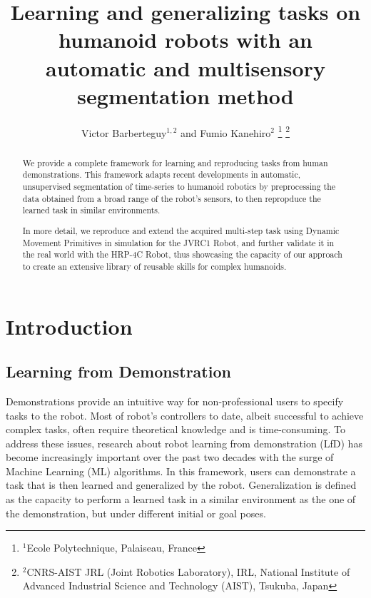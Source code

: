 \documentclass[a4paper, 10pt, conference]{ieeeconf}
\title{\textbf{Learning and generalizing tasks on humanoid robots with an automatic and multisensory segmentation method}
}
\author{Victor Barberteguy$^{1,2}$ and Fumio Kanehiro$^{2}$
\thanks{$^{1}$Ecole Polytechnique, Palaiseau, France}
\thanks{$^{2}$CNRS-AIST JRL (Joint Robotics Laboratory), IRL, National Institute of Advanced Industrial Science and Technology (AIST), Tsukuba, Japan}
}
\begin{document}
\maketitle
\thispagestyle{empty}
\pagestyle{empty}

\begin{abstract}
We provide a complete framework for learning and reproducing tasks from human demonstrations. This framework adapts recent developments in automatic, unsupervised segmentation of time-series to humanoid robotics by preprocessing the data obtained from a broad range of the robot's sensors, to then repropduce the learned task in similar environments.

In more detail,  we reproduce and extend the acquired multi-step task using Dynamic Movement Primitives in simulation for the JVRC1 Robot, and further validate it in the real world with the HRP-4C Robot, thus showcasing the capacity of our approach to create an extensive library of reusable skills for complex humanoids.
\end{abstract}


\section{Introduction}
\subsection{Learning from Demonstration}

Demonstrations provide an intuitive way for non-professional users to specify tasks to the robot\cite{schaal_is_1999}. Most of robot's controllers to date, albeit successful to achieve complex tasks, often require theoretical knowledge and is time-consuming. To address these issues, research about robot learning from demonstration (LfD) has become increasingly important over the past two decades with the surge of Machine Learning (ML) algorithms\cite{argall_survey_2009,ravichandar_recent_2020}. In this framework, users can demonstrate a task that is then learned and generalized by the robot. Generalization is defined as the capacity to perform a learned task in a similar environment as the one of the demonstration, but under different initial or goal poses. 
\end{document}
